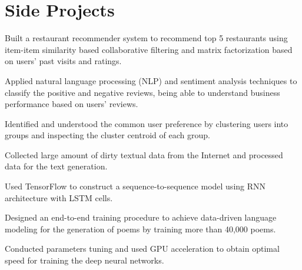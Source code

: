 \documentclass[letterpaper]{deedy-resume-openfont}
\begin{document}



\section{Side Projects}
\descript{}
\location{}
\begin{tightemize}
\item Built a restaurant recommender system to recommend top 5 restaurants using item-item similarity based collaborative filtering and matrix factorization based on users’ past visits and ratings.
\item Applied natural language processing (NLP) and sentiment analysis techniques to classify the positive and negative reviews, being able to understand business performance based on users' reviews.
\item Identified and understood the common user preference by clustering users into groups and inspecting the cluster centroid of each group.
\end{tightemize}
\sectionsep

\descript{}
\location{}
\begin{tightemize}
\item Collected large amount of dirty textual data from the Internet and processed data for the text generation.
\item Used TensorFlow to construct a sequence-to-sequence model using RNN architecture with LSTM cells.
\item Designed an end-to-end training procedure to achieve data-driven language modeling for the generation of poems by training more than 40,000 poems.
\item Conducted parameters tuning and used GPU acceleration to obtain optimal speed for training the deep neural networks.
\end{tightemize}
\sectionsep
\end{document}
